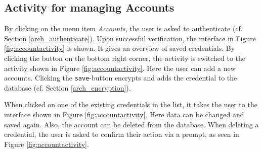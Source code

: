 
\subsection{Activity for managing Accounts}
By clicking on the menu item \textit{Accounts}, the user is asked to authenticate (cf. Section \ref{arch_authenticate}). Upon successful verification, the interface in Figure \ref{fig:accountactivity}\protect{} is shown. It gives an overview of saved credentials. By clicking the button on the bottom right corner, the activity is switched to the activity shown in Figure \ref{fig:accountactivity}\protect{}. Here the user can add a new accounts. Clicking the \texttt{save}-button encrypts and adds the credential to the database (cf. Section \ref{arch_encryption}).

When clicked on one of the existing credentials in the list, it takes the user to the interface shown in Figure \ref{fig:accountactivity}\protect{}.  Here data can be changed and saved again. Also, the account can be deleted from the database. When deleting a credential, the user is asked to confirm their action via a prompt, as seen in Figure \ref{fig:accountactivity}\protect{}.


